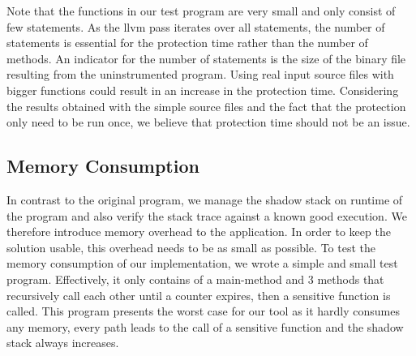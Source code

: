 \documentclass{llncs}
\begin{document}
Note that the functions in our test program are very small and only consist of few statements. As the llvm pass iterates over all statements, the number of statements is essential for the protection time rather than the number of methods. An indicator for the number of statements is the size of the binary file resulting from the uninstrumented program. Using real input source files with bigger functions could result in an increase in the protection time. Considering the results obtained with the simple source files and the fact that the protection only need to be run once, we believe that protection time should not be an issue.

\begin{table}
  \centering {}
  \caption{Protection time for different programs}
  \label{table:protectionTime}
\end{table}


\subsection{Memory Consumption}
In contrast to the original program, we manage the shadow stack on runtime of the program and also verify the stack trace against a known good execution. We therefore introduce memory overhead to the application. In order to keep the solution usable, this overhead needs to be as small as possible. To test the memory consumption of our implementation, we wrote a simple and small test program. Effectively, it only contains of a main-method and 3 methods that recursively call each other until a counter expires, then a sensitive function is called. This program presents the worst case for our tool as it hardly consumes any memory, every path leads to the call of a sensitive function and the shadow stack always increases.
\end{document}
